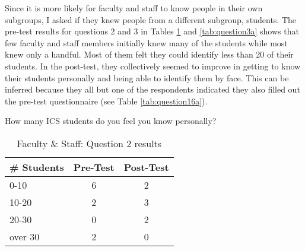 Since it is more likely for faculty and staff to know people in their own
subgroups, I asked if they knew people from a different subgroup, students.
The pre-test results for questions 2 and 3 in Tables \ref{tab:question2a} and
\ref{tab:question3a} shows that few faculty and staff members initially knew
many of the students while most knew only a handful.  Most of them felt they
could identify less than 20 of their students.  In the post-test, they
collectively seemed to improve in getting to know their students personally and
being able to identify them by face.  This can be inferred because they all but
one of the respondents indicated they also filled out the pre-test
questionnaire (see Table \ref{tab:question16a}).

\begin{table}[htb]
\caption{Faculty \& Staff: Question 2 results}
{How many ICS students do you feel you know personally?}
\begin{center}
\begin{tabular}{|l|l|l|} \hline
 \multicolumn{1}{|c|}{\bf \# Students} &
 \multicolumn{1}{|c|}{\bf Pre-Test} &
 \multicolumn{1}{|c|}{\bf Post-Test} \\ \hline
 0-10    & \multicolumn{1}{|c|}{6} & \multicolumn{1}{|c|}{2} \\ \hline 
 10-20   & \multicolumn{1}{|c|}{2} & \multicolumn{1}{|c|}{3} \\ \hline 
 20-30   & \multicolumn{1}{|c|}{0} & \multicolumn{1}{|c|}{2} \\ \hline 
 over 30 & \multicolumn{1}{|c|}{2} & \multicolumn{1}{|c|}{0} \\ \hline
\end{tabular}
\end{center}
\label{tab:question2a}
\end{table}

